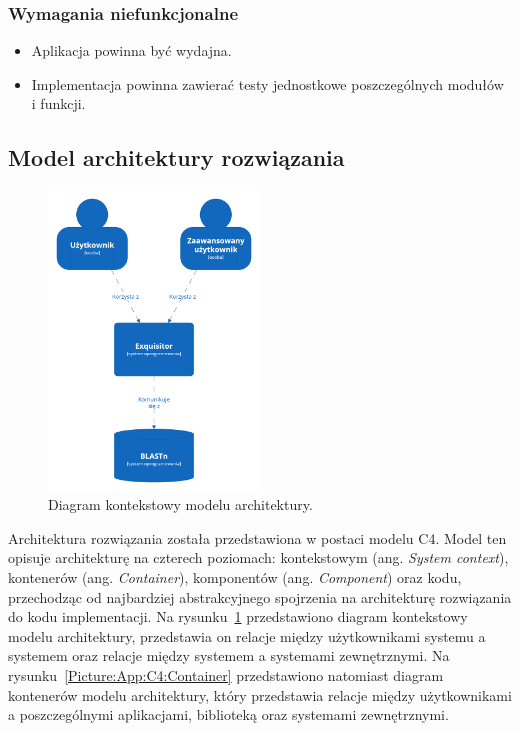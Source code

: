         \subsubsection{Wymagania niefunkcjonalne}

            \begin{itemize}
                \item Aplikacja powinna być wydajna.
                \item Implementacja powinna zawierać testy jednostkowe poszczególnych modułów i funkcji.
            \end{itemize}

            \subsection{Model architektury rozwiązania}

        \begin{figure}[!htb]
            \begin{center}
                \includegraphics[width=0.5\textwidth]{tex/pictures/app/c4_system_context.png}
            \end{center}
            \caption{
                Diagram kontekstowy modelu architektury.
            }\label{Picture:App:C4:Context}
        \end{figure}

        Architektura rozwiązania została przedstawiona w postaci modelu C4\cite{C4}. Model ten opisuje architekturę na czterech poziomach: kontekstowym (ang. \textit{System context}), kontenerów (ang. \textit{Container}), komponentów (ang. \textit{Component}) oraz kodu, przechodząc od najbardziej abstrakcyjnego spojrzenia na architekturę rozwiązania do kodu implementacji. Na rysunku~\ref{Picture:App:C4:Context} przedstawiono diagram kontekstowy modelu architektury, przedstawia on relacje między użytkownikami systemu a systemem oraz relacje między systemem a systemami zewnętrznymi. Na rysunku~\ref{Picture:App:C4:Container} przedstawiono natomiast diagram kontenerów modelu architektury, który przedstawia relacje między użytkownikami a poszczególnymi aplikacjami, biblioteką oraz systemami zewnętrznymi.


